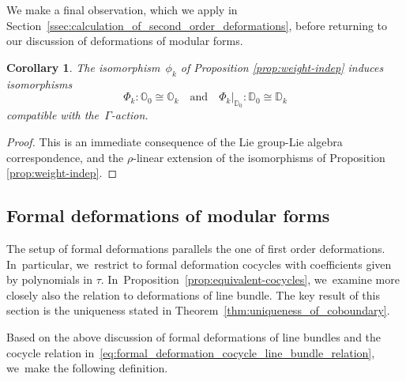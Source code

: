 \documentclass[10pt,a4paper]{article}
\numberwithin{equation}{section}
\theoremstyle{plain}
\newtheorem{corollary}[theoremcounter]{Corollary}
\theoremstyle{definition}
\newcommand{\nbd}{\nobreakdash-\hspace{0pt}}
\newcommand{\bbD}{\ensuremath{\mathbb{D}}}
\newcommand{\bbO}{\ensuremath{\mathbb{O}}}
\newcommand{\defcol}{\mathrel{:}}
\let\Ga\Gamma
\begin{document}
We make a final observation, which we apply in Section~\ref{ssec:calculation_of_second_order_deformations}, before returning to our discussion of deformations of modular forms.

\begin{corollary}\label{cor:weight-indep}
The isomorphism~$\phi_k$ of Proposition \ref{prop:weight-indep} induces isomorphisms
\begin{equation*}
\Phi_k \defcol \bbO_0\cong \bbO_k
\quad\text{and}\quad
\Phi_k \big|_{\bbD_0}: \bbD_0 \cong\bbD_k
\end{equation*}
compatible with the~$\Ga$\nbd{}action.
\end{corollary}

\begin{proof}
This is an immediate consequence of the Lie group-Lie algebra correspondence, and the $\rho$-linear extension of the isomorphisms of Proposition \ref{prop:weight-indep}.
\end{proof}

\subsection{Formal deformations of modular forms}
\label{ssec:formal_deformations_modular_forms}

The setup of formal deformations parallels the one of first order deformations. In~particular, we~restrict to formal deformation cocycles with coefficients given by polynomials in $\tau$. In~Proposition~\ref{prop:equivalent-cocycles}, we~examine more closely also the relation to deformations of line bundle. The key result of this section is the uniqueness stated in Theorem~\ref{thm:uniqueness_of_coboundary}.

Based on the above discussion of formal deformations of line bundles and the cocycle relation in~\eqref{eq:formal_deformation_cocycle_line_bundle_relation}, we~make the following definition.
\end{document}
